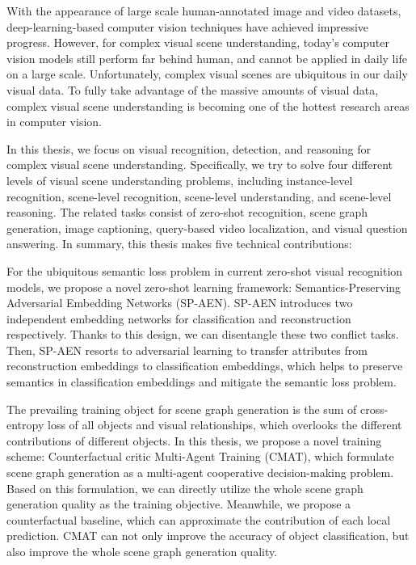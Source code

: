 \begin{englishabstract}

With the appearance of large scale human-annotated image and video datasets, deep-learning-based computer vision techniques have achieved impressive progress. However, for complex visual scene understanding, today's computer vision models still perform far behind human, and cannot be applied in daily life on a large scale. Unfortunately, complex visual scenes are ubiquitous in our daily visual data. To fully take advantage of the massive amounts of visual data, complex visual scene understanding is becoming one of the hottest research areas in computer vision.

In this thesis, we focus on visual recognition, detection, and reasoning for complex visual scene understanding. Specifically, we try to solve four different levels of visual scene understanding problems, including instance-level recognition, scene-level recognition, scene-level understanding, and scene-level reasoning. The related tasks consist of zero-shot recognition, scene graph generation, image captioning, query-based video localization, and visual question answering. In summary, this thesis makes five technical contributions:

\begin{asparaenum} 
\item For the ubiquitous semantic loss problem in current zero-shot visual recognition models, we propose a novel zero-shot learning framework: Semantics-Preserving Adversarial Embedding Networks (SP-AEN). SP-AEN introduces two independent embedding networks for classification and reconstruction respectively. Thanks to this design, we can disentangle these two conflict tasks. Then, SP-AEN resorts to adversarial learning to transfer attributes from reconstruction embeddings to classification embeddings, which helps to preserve semantics in classification embeddings and mitigate the semantic loss problem.

\item The prevailing training object for scene graph generation is the sum of cross-entropy loss of all objects and visual relationships, which overlooks the different contributions of different objects. In this thesis, we propose a novel training scheme: Counterfactual critic Multi-Agent Training (CMAT), which formulate scene graph generation as a multi-agent cooperative decision-making problem. Based on this formulation, we can directly utilize the whole scene graph generation quality as the training objective. Meanwhile, we propose a counterfactual baseline, which can approximate the contribution of each local prediction. CMAT can not only improve the accuracy of object classification, but also improve the whole scene graph generation quality.


\end{asparaenum}
\end{englishabstract}
